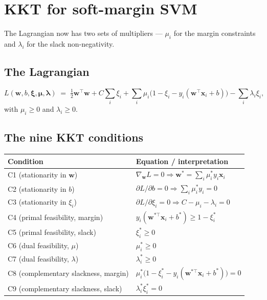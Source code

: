 \documentclass[11pt, a4paper]{article}
\newcommand{\thead}[1]{\textbf{#1}}
\begin{document}
\section{KKT for soft-margin SVM}

The Lagrangian now has two sets of multipliers — $\mu_i$ for the margin constraints and $\lambda_i$ for the slack non-negativity.

\subsection{The Lagrangian}

\[
L(\mathbf{w}, b, \boldsymbol\xi, \boldsymbol\mu, \boldsymbol\lambda) \;=\; \tfrac{1}{2}\mathbf{w}^\top\mathbf{w} + C\sum_i \xi_i + \sum_i \mu_i\big(1 - \xi_i - y_i(\mathbf{w}^\top\mathbf{x}_i + b)\big) - \sum_i \lambda_i \xi_i,
\]
with $\mu_i \ge 0$ and $\lambda_i \ge 0$.

\subsection{The nine KKT conditions}

\begin{tabularx}{\linewidth}{@{}lX@{}}
\toprule
\thead{Condition} & \thead{Equation / interpretation} \\
\midrule
C1 (stationarity in $\mathbf{w}$) & $\nabla_\mathbf{w} L = 0 \Rightarrow \mathbf{w}^* = \sum_i \mu_i^* y_i \mathbf{x}_i$ \\
C2 (stationarity in $b$)        & $\partial L/\partial b = 0 \Rightarrow \sum_i \mu_i^* y_i = 0$ \\
C3 (stationarity in $\xi_i$)    & $\partial L/\partial \xi_i = 0 \Rightarrow C - \mu_i - \lambda_i = 0$ \\
C4 (primal feasibility, margin) & $y_i(\mathbf{w}^{*\top}\mathbf{x}_i + b^*) \ge 1 - \xi_i^*$ \\
C5 (primal feasibility, slack)  & $\xi_i^* \ge 0$ \\
C6 (dual feasibility, $\mu$)     & $\mu_i^* \ge 0$ \\
C7 (dual feasibility, $\lambda$) & $\lambda_i^* \ge 0$ \\
C8 (complementary slackness, margin) & $\mu_i^*\big(1 - \xi_i^* - y_i(\mathbf{w}^{*\top}\mathbf{x}_i + b^*)\big) = 0$ \\
C9 (complementary slackness, slack)  & $\lambda_i^* \xi_i^* = 0$ \\
\bottomrule
\end{tabularx}
\end{document}
